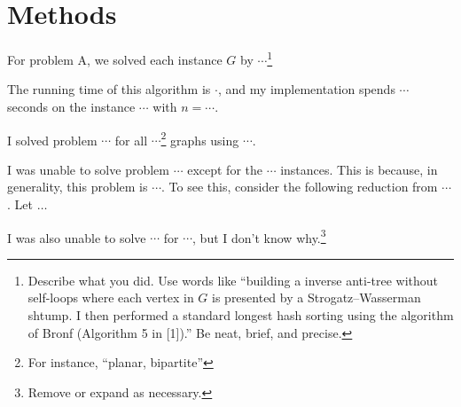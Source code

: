 \chapter{Methods}


For problem A, we solved each instance $G$ by $\cdots$\footnote{Describe what you did.
  Use words like ``building a inverse anti-tree without self-loops where each vertex in $G$ is presented by a Strogatz--Wasserman shtump.
  I then performed a standard longest hash sorting using the algorithm of Bronf (Algorithm 5 in [1]).''
  Be neat, brief, and precise.}

The running time of this algorithm is $\cdot$, and my implementation spends $\cdots$ seconds on the instance $\cdots$ with  $n=\cdots$.

I solved problem $\cdots$ for all $\cdots$\footnote{For instance, “planar, bipartite”} graphs using $\cdots$.

I was unable to solve problem $\cdots$ except for the $\cdots$ instances.
This is because, in generality, this problem is $\cdots$. 
To see this, consider the following reduction from $\cdots$.
Let $\ldots$ 

I was also unable to solve $\cdots$ for $\cdots$, but I don’t know why.\footnote{Remove or expand as necessary.}

